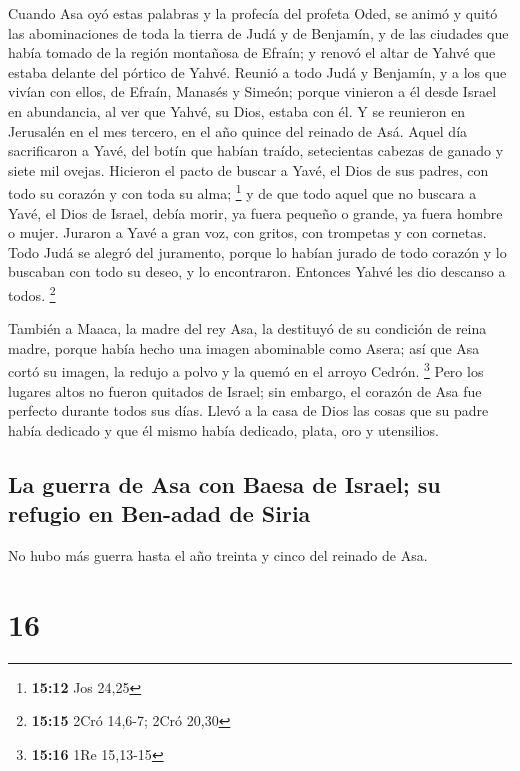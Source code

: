  Cuando Asa oyó estas palabras y la profecía del profeta
Oded, se animó y quitó las abominaciones de toda la tierra de Judá y de
Benjamín, y de las ciudades que había tomado de la región montañosa de
Efraín; y renovó el altar de Yahvé que estaba delante del pórtico de
Yahvé.  Reunió a todo Judá y Benjamín, y a los que vivían
con ellos, de Efraín, Manasés y Simeón; porque vinieron a él desde
Israel en abundancia, al ver que Yahvé, su Dios, estaba con él.
 Y se reunieron en Jerusalén en el mes tercero, en el año
quince del reinado de Asá.  Aquel día sacrificaron a
Yavé, del botín que habían traído, setecientas cabezas de ganado y siete
mil ovejas.  Hicieron el pacto de buscar a Yavé, el Dios
de sus padres, con todo su corazón y con toda su alma; \footnote{\textbf{15:12}
  Jos 24,25}  y de que todo aquel que no buscara a Yavé,
el Dios de Israel, debía morir, ya fuera pequeño o grande, ya fuera
hombre o mujer.  Juraron a Yavé a gran voz, con gritos,
con trompetas y con cornetas.  Todo Judá se alegró del
juramento, porque lo habían jurado de todo corazón y lo buscaban con
todo su deseo, y lo encontraron. Entonces Yahvé les dio descanso a
todos. \footnote{\textbf{15:15} 2Cró 14,6-7; 2Cró 20,30}

 También a Maaca, la madre del rey Asa, la destituyó de
su condición de reina madre, porque había hecho una imagen abominable
como Asera; así que Asa cortó su imagen, la redujo a polvo y la quemó en
el arroyo Cedrón. \footnote{\textbf{15:16} 1Re 15,13-15} 
Pero los lugares altos no fueron quitados de Israel; sin embargo, el
corazón de Asa fue perfecto durante todos sus días. 
Llevó a la casa de Dios las cosas que su padre había dedicado y que él
mismo había dedicado, plata, oro y utensilios.

\hypertarget{la-guerra-de-asa-con-baesa-de-israel-su-refugio-en-ben-adad-de-siria}{%
\subsection{La guerra de Asa con Baesa de Israel; su refugio en Ben-adad
de
Siria}\label{la-guerra-de-asa-con-baesa-de-israel-su-refugio-en-ben-adad-de-siria}}

 No hubo más guerra hasta el año treinta y cinco del
reinado de Asa.

\hypertarget{section-15}{%
\section{16}\label{section-15}}

